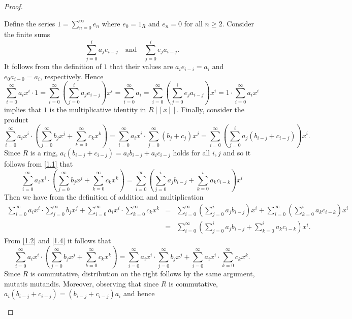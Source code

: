 \documentclass[10pt]{amsart}
\begin{document}
\begin{thm}
\begin{proof}
\begin{enumerate}[(a)]
      Define the series $1 = \sum_{n=0}^\infty e_n$ where $e_0 = 1_R$ and $e_n = 0$ for all $n \geq 2$.  
      Consider the finite sums 
      $$\sum_{j=0}^i a_j e_{i-j}\quad \text{and}\quad \sum_{j=0}^i e_j a_{i-j}.$$
      It follows from the definition of $1$ that their values are  $a_ie_{i-i} = a_i$ and $e_0a_{i-0} = a_i$, respectively.
      Hence 
      $$\sum_{i=0}^\infty a_ix^i \cdot 1 = \sum_{i=0}^\infty \left(\sum_{j=0}^i a_j e_{i-j}\right)x^i  = \sum_{i=0}^\infty a_i =\sum_{i=0}^\infty \left(\sum_{j=0}^i e_j a_{i-j}\right)x^i = 1 \cdot \sum_{i=0}^\infty a_ix^i$$
      implies that $1$ is the multiplicative identity in $R[[x]]$.
      Finally, consider the product
      \begin{equation}\label{1.1}
        \sum_{i=0}^\infty a_ix^i \cdot \left(\sum_{j=0}^\infty b_jx^j + \sum_{k=0}^\infty c_kx^k \right) = \sum_{i=0}^\infty a_ix^i \cdot \sum_{j=0}^\infty (b_j + c_j)x^j = \sum_{i=0}^\infty \left(\sum_{j=0}^i a_j(b_{i-j} + c_{i-j})\right)x^i.
      \end{equation}
      Since $R$ is a ring, $a_i(b_{i-j} + c_{i-j}) = a_ib_{i-j} + a_ic_{i-j}$ holds for all $i,j$ and so it follows from \eqref{1.1} that
      \begin{equation}\label{1.2}
        \sum_{i=0}^\infty a_ix^i \cdot \left(\sum_{j=0}^\infty b_jx^j + \sum_{k=0}^\infty c_kx^k \right) = \sum_{i=0}^\infty \left(\sum_{j=0}^i a_jb_{i-j} +  \sum_{k=0}^i a_kc_{i-k}\right)x^i
      \end{equation}
      Then we have from the definition of addition and multiplication
      \begin{eqnarray}
        \sum_{i=0}^\infty a_ix^i \cdot \sum_{j=0}^\infty b_jx^j + \sum_{i=0}^\infty a_ix^i \cdot \sum_{k=0}^\infty c_kx^k &=& \sum_{i=0}^\infty \left(\sum_{j=0}^i a_jb_{i-j}\right)x^i +  \sum_{i=0}^\infty \left(\sum_{k=0}^i a_{k}c_{i-k}\right)x^i\\\label{1.3}
        &=& \sum_{i=0}^\infty \left(\sum_{j=0}^i a_jb_{i-j} +  \sum_{k=0}^i a_kc_{i-k}\right)x^i.\label{1.4}
      \end{eqnarray}
      From \eqref{1.2} and \eqref{1.4} it follows that
      $$\sum_{i=0}^\infty a_ix^i \cdot \left(\sum_{j=0}^\infty b_jx^j + \sum_{k=0}^\infty c_kx^k \right) = \sum_{i=0}^\infty a_ix^i \cdot \sum_{j=0}^\infty b_jx^j + \sum_{i=0}^\infty a_ix^i \cdot \sum_{k=0}^\infty c_kx^k.$$
      Since $R$ is commutative, distribution on the right follows by the same argument, mutatis mutandis.
      Moreover, observing that since $R$ is commutative, $a_i(b_{i-j} + c_{i-j}) = (b_{i-j} + c_{i-j})a_i$ and hence

\end{enumerate}
\end{proof}
\end{thm}
\end{document}

